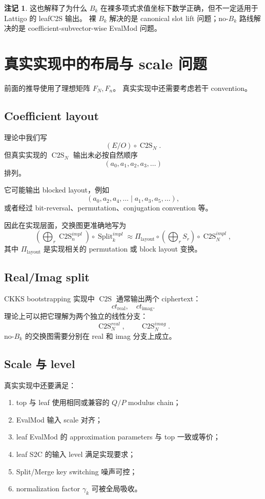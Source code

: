 \documentclass[UTF8,11pt]{ctexart}
\theoremstyle{definition}
\newtheorem{remark}{注记}
\newcommand{\CtwoS}{\operatorname{C2S}}
\newcommand{\Split}{\operatorname{Split}}
\begin{document}
\begin{remark}
这也解释了为什么 \(B_k\) 在裸多项式求值坐标下数学正确，但不一定适用于 Lattigo 的 leafC2S 输出。
裸 \(B_k\) 解决的是 canonical slot lift 问题；no-\(B_k\) 路线解决的是 coefficient-subvector-wise EvalMod 问题。
\end{remark}

\section{真实实现中的布局与 scale 问题}

前面的推导使用了理想矩阵 \(F_N,F_n\)。
真实实现中还需要考虑若干 convention。

\subsection{Coefficient layout}

理论中我们写
\[
(E/O)\circ\CtwoS_N.
\]
但真实实现的 \(\CtwoS_N\) 输出未必按自然顺序
\[
(a_0,a_1,a_2,a_3,\ldots)
\]
排列。

它可能输出 blocked layout，例如
\[
(a_0,a_2,a_4,\ldots\mid a_1,a_3,a_5,\ldots),
\]
或者经过 bit-reversal、permutation、conjugation convention 等。

因此在实现层面，交换图更准确地写为
\[
\left(\bigoplus_r \CtwoS_n^{impl}\right)\circ\Split_k^{impl}
\approx
\Pi_{\mathrm{layout}}
\circ
\left(\bigoplus_r S_r\right)
\circ
\CtwoS_N^{impl},
\]
其中 \(\Pi_{\mathrm{layout}}\) 是实现相关的 permutation 或 block layout 变换。

\subsection{Real/Imag split}

CKKS bootstrapping 实现中 \(\CtwoS\) 通常输出两个 ciphertext：
\[
ct_{\mathrm{real}},\quad ct_{\mathrm{imag}}.
\]
理论上可以把它理解为两个独立的线性分支：
\[
\CtwoS_N^{real},
\qquad
\CtwoS_N^{imag}.
\]
no-\(B_k\) 的交换图需要分别在 real 和 imag 分支上成立。

\subsection{Scale 与 level}

真实实现中还要满足：
\begin{enumerate}[label=(\arabic*)]
    \item top 与 leaf 使用相同或兼容的 \(Q/P\) modulus chain；
    \item EvalMod 输入 scale 对齐；
    \item leaf EvalMod 的 approximation parameters 与 top 一致或等价；
    \item leaf S2C 的输入 level 满足实现要求；
    \item Split/Merge key switching 噪声可控；
    \item normalization factor \(\gamma_k\) 可被全局吸收。
\end{enumerate}
\end{document}
